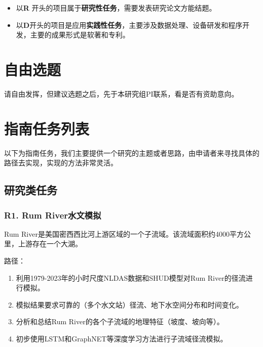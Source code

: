 \documentclass[
]{book}
\providecommand{\tightlist}{%
  \setlength{\itemsep}{0pt}\setlength{\parskip}{0pt}}
\begin{document}
\begin{itemize}
\tightlist
\item
  以\textbf{R} 开头的项目属于\textbf{研究性任务}，需要发表研究论文方能结题。
\item
  以\textbf{D}开头的项目是应用\textbf{实践性任务}，主要涉及数据处理、设备研发和程序开发，主要的成果形式是软著和专利。
\end{itemize}

\hypertarget{ux81eaux7531ux9009ux9898}{%
\section{自由选题}\label{ux81eaux7531ux9009ux9898}}

请自由发挥，但建议选题之后，先于本研究组PI联系，看是否有资助意向。

\hypertarget{ux6307ux5357ux4efbux52a1ux5217ux8868}{%
\section{指南任务列表}\label{ux6307ux5357ux4efbux52a1ux5217ux8868}}

以下为指南任务，我们主要提供一个研究的主题或者思路，由申请者来寻找具体的路径去实现，实现的方法非常灵活。

\hypertarget{ux7814ux7a76ux7c7bux4efbux52a1}{%
\subsection{研究类任务}\label{ux7814ux7a76ux7c7bux4efbux52a1}}

\hypertarget{r1.-rum-riverux6c34ux6587ux6a21ux62df}{%
\subsubsection{\texorpdfstring{\textbf{R1. Rum River水文模拟}}{R1. Rum River水文模拟}}\label{r1.-rum-riverux6c34ux6587ux6a21ux62df}}

Rum River是美国密西西比河上游区域的一个子流域。该流域面积约4000平方公里，上游存在一个大湖。

路径：

\begin{enumerate}
\def\labelenumi{\arabic{enumi}.}
\tightlist
\item
  利用1979-2023年的小时尺度NLDAS数据和SHUD模型对Rum River的径流进行模拟。
\item
  模拟结果要求可靠的（多个水文站）径流、地下水空间分布和时间变化。
\item
  分析和总结Rum River的各个子流域的地理特征（坡度、坡向等）。
\item
  初步使用LSTM和GraphNET等深度学习方法进行子流域径流模拟。
\end{enumerate}
\end{document}
